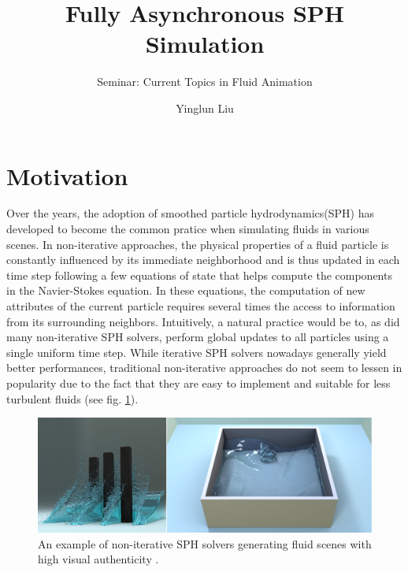 \documentclass[
	11pt, 
	DIV10,
	ngerman,
	a4paper, 
	oneside, 
	headings=normal, 
	captions=tableheading,
	final, 
	numbers=noenddot
]{scrartcl}
\title{Fully Asynchronous SPH Simulation}
\subtitle{\vspace{0.5cm}Seminar: Current Topics in Fluid Animation}
\author{Yinglun Liu}
\begin{document}
\maketitle


\section{Motivation}

Over the years, the adoption of smoothed particle hydrodynamics(SPH) has developed to become the common pratice when simulating fluids in various scenes. In non-iterative approaches, the physical properties of a fluid particle is constantly influenced by its immediate neighborhood and is thus updated in each time step following a few equations of state that helps compute the components in the Navier-Stokes equation. In these equations, the computation of new attributes of the current particle requires several times the access to information from its surrounding neighbors. Intuitively, a natural practice would be to, as did many non-iterative SPH solvers, perform global updates to all particles using a single uniform time step. While iterative SPH solvers nowadays generally yield better performances, traditional non-iterative approaches do not seem to lessen in popularity due to the fact that they are easy to implement and suitable for less turbulent fluids (see fig. \ref{fig1}).

\begin{figure}[tb]
	\centering
	\includegraphics[scale=0.3]{images/3}
	\caption{\label{fig1} An example of non-iterative SPH solvers generating fluid scenes with high visual authenticity \cite{reinhardt2017fully}.
	}
\end{figure}
\end{document}
